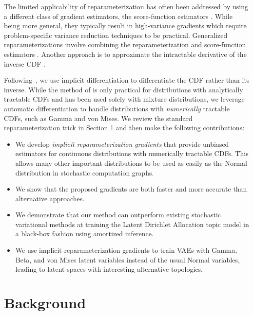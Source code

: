 \documentclass{article}
\begin{document}
The limited applicability of reparameterization has often been addressed by using a different class of gradient estimators, the score-function estimators \citep{fu2006gradient, glynn1990likelihood, williams1992simple}. While being more general, they typically result in high-variance gradients which require problem-specific variance reduction techniques to be practical.
Generalized reparameterizations involve combining the reparameterization and score-function estimators \citep{ruiz2016generalized, naesseth2017reparameterization}.
Another approach is to approximate the intractable derivative of the inverse CDF \cite{knowles2015stochastic}.

Following~\citet{graves2016stochastic}, we use implicit differentiation to differentiate the CDF rather than its inverse.
While the method of \citet{graves2016stochastic} is only practical for distributions with analytically tractable CDFs and has been used solely with mixture distributions, we leverage automatic differentiation to handle distributions with \emph{numerically} tractable CDFs, such as Gamma and von Mises.
We review the standard reparameterization trick in Section \ref{sect:standard_trick} and then make the following contributions:
\vspace{-2mm}
\begin{itemize}[leftmargin=*,noitemsep]
\item We develop \emph{implicit reparameterization gradients} that provide unbiased estimators for continuous distributions with numerically tractable CDFs. This allows many other important distributions to be used as easily as the Normal distribution in stochastic computation graphs.
\item We show that the proposed gradients are both faster and more accurate than alternative approaches.
\item We demonstrate that our method can outperform existing stochastic variational methods at training the Latent Dirichlet Allocation topic model in a black-box fashion using amortized inference.
\item We use implicit reparameterization gradients to train VAEs with Gamma, Beta, and von Mises latent variables instead of the usual Normal variables, leading to latent spaces with interesting alternative topologies.
\end{itemize}

 
\section{Background}
\label{sect:standard_trick}
\end{document}
